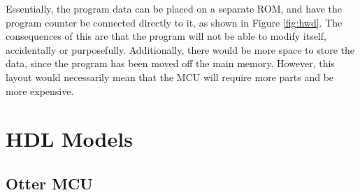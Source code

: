 \documentclass{article}
\begin{document}
Essentially, the program data can be placed on a separate ROM, and have the program 
counter be connected directly to it, as shown in Figure \ref{fig:hwd}. The consequences of
this are that the program will not be able to modify itself, accidentally or 
purposefully. Additionally, there would be more space to store the data, since the 
program has been moved off the main memory. However, this layout would necessarily 
mean that the MCU will require more parts and be more expensive. 

\pagebreak

\section{HDL Models}

\subsection{Otter MCU}
\end{document}
